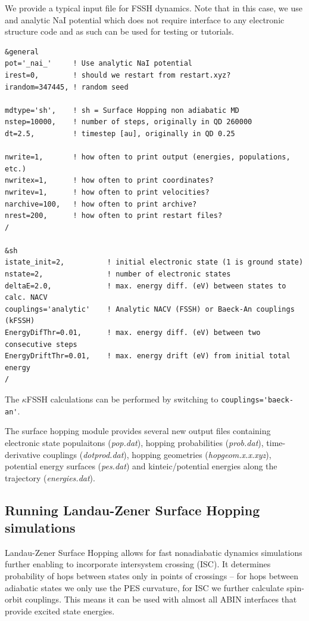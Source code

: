 We provide a typical input file for FSSH dynamics. Note that in this case, we use and analytic NaI potential which does not require interface to any electronic structure code and as such can be used for testing or tutorials.
\begin{verbatim}
&general
pot='_nai_'     ! Use analytic NaI potential
irest=0,        ! should we restart from restart.xyz?
irandom=347445, ! random seed

mdtype='sh',    ! sh = Surface Hopping non adiabatic MD
nstep=10000,    ! number of steps, originally in QD 260000
dt=2.5,         ! timestep [au], originally in QD 0.25

nwrite=1,       ! how often to print output (energies, populations, etc.)
nwritex=1,      ! how often to print coordinates?
nwritev=1,      ! how often to print velocities?
narchive=100,   ! how often to print archive?
nrest=200,      ! how often to print restart files?
/

&sh
istate_init=2,          ! initial electronic state (1 is ground state)
nstate=2,               ! number of electronic states
deltaE=2.0,             ! max. energy diff. (eV) between states to calc. NACV
couplings='analytic'    ! Analytic NACV (FSSH) or Baeck-An couplings (kFSSH)
EnergyDifThr=0.01,      ! max. energy diff. (eV) between two consecutive steps
EnergyDriftThr=0.01,    ! max. energy drift (eV) from initial total energy
/
\end{verbatim}
The $\kappa$FSSH calculations can be performed by switching to \verb|couplings='baeck-an'|.

The surface hopping module provides several new output files containing electronic state populaitons (\textit{pop.dat}), hopping probabilities (\textit{prob.dat}), time-derivative couplings (\textit{dotprod.dat}), hopping geometries (\textit{hopgeom.x.x.xyz}), potential energy surfaces (\textit{pes.dat}) and kinteic/potential energies along the trajectory (\textit{energies.dat}).


\subsection{Running Landau-Zener Surface Hopping simulations}
Landau-Zener Surface Hopping allows for fast nonadiabatic dynamics simulations further enabling to incorporate intersystem crossing (ISC).\cite{SuchanLZ} It determines probability of hops between states only in points of crossings -- for hops between adiabatic states we only use the PES curvature, for ISC we further calculate spin-orbit couplings. This means it can be used with almost all ABIN interfaces that provide excited state energies. 

